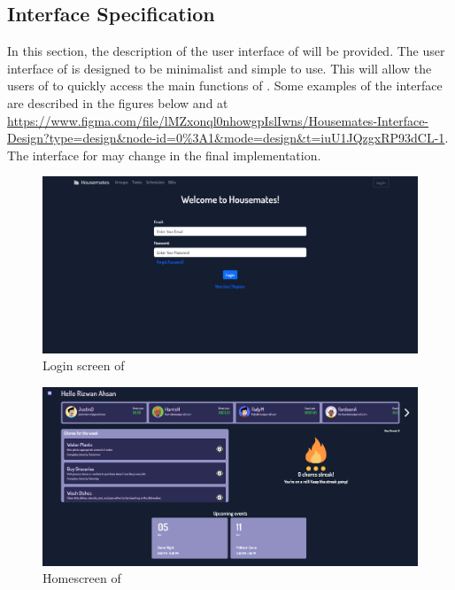 \documentclass[12pt, titlepage]{article}
\begin{document}
\subsection{Interface Specification} \label{Interface}

In this section, the description of the user interface of \progname{} will be provided. The user interface of \progname{} is designed to be minimalist and simple to use. This will allow the users of \progname{} to quickly access the main functions of \progname{}. Some examples of the interface are described in the figures below and at \url{https://www.figma.com/file/lMZxonql0nhowgpIslIwns/Housemates-Interface-Design?type=design&node-id=0%3A1&mode=design&t=iuU1JQzgxRP93dCL-1}. The interface for \progname{} may change in the final implementation.

\begin{figure}[H]
\centering
\includegraphics[width=\textwidth]{Login.png}
\caption{Login screen of \progname{}}
\label{FigLogin}
\end{figure}

\begin{figure}[H]
\centering
\includegraphics[width=\textwidth]{Homescreen.png}
\caption{Homescreen of \progname{}}
\label{FigHome}
\end{figure}
\end{document}
